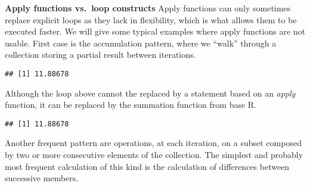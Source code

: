 \documentclass[krantz2]{krantz}\usepackage{knitr}%
\begin{document}
\begin{explainbox}
\textbf{Apply functions vs.\ loop constructs} Apply functions can only sometimes replace explicit loops as they lack in flexibility, which is what allows them to be executed faster. We will give some typical examples where apply functions are not usable. First case is the accumulation pattern, where we ``walk'' through a collection storing a partial result between iterations.

\begin{knitrout}\footnotesize
{}\color{fgcolor}\begin{kframe}
\begin{alltt}
\hlstd{(}\hlstd{)}
 \hlkwb{<-} \hlstd{(}\hlstd{)}
 \hlkwb{<-} 
   \hlstd{(} 
   \hlkwb{<-}  \hlopt{+} 
  \hlstd{\}}
\end{alltt}
\begin{verbatim}
## [1] 11.88678
\end{verbatim}
\end{kframe}
\end{knitrout}

Although the loop above cannot the replaced by a statement based on an \emph{apply} function, it can be replaced by the summation function  from base R.

\begin{knitrout}\footnotesize
{}\color{fgcolor}\begin{kframe}
\begin{alltt}
\hlstd{(}\hlstd{)}
 \hlkwb{<-} \hlstd{(}\hlstd{)}
 \hlkwb{<-} 
\end{alltt}
\begin{verbatim}
## [1] 11.88678
\end{verbatim}
\end{kframe}
\end{knitrout}

Another frequent pattern are operations, at each iteration, on a subset composed by two or more consecutive elements of the collection. The simplest and probably most frequent calculation of this kind is the calculation of differences between successive members.


\end{explainbox}
\end{document}
